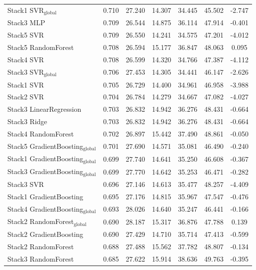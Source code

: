 \documentclass[a4paper,twocolumn]{article}
\begin{document}
\begin{table}
{\begin{tabular}{p{4.5cm}cccccc}
        Stack1 SVR$_{\text{global}}$ & 0.710 & 27.240 & 14.307 & 34.445 & 45.502 & -2.747 \\
        Stack3 MLP & 0.709 & 26.544 & 14.875 & 36.114 & 47.914 & -0.401 \\
        Stack5 SVR & 0.709 & 26.550 & 14.241 & 34.575 & 47.201 & -4.012 \\
        Stack5 RandomForest & 0.708 & 26.594 & 15.177 & 36.847 & 48.063 & 0.095 \\
        Stack4 SVR & 0.708 & 26.599 & 14.320 & 34.766 & 47.387 & -4.112 \\
        Stack3 SVR$_{\text{global}}$ & 0.706 & 27.453 & 14.305 & 34.441 & 46.147 & -2.626 \\
        Stack1 SVR & 0.705 & 26.729 & 14.400 & 34.961 & 46.958 & -3.988 \\
        Stack2 SVR & 0.704 & 26.784 & 14.279 & 34.667 & 47.082 & -4.027 \\
        Stack3 LinearRegression & 0.703 & 26.832 & 14.942 & 36.276 & 48.431 & -0.664 \\
        Stack3 Ridge & 0.703 & 26.832 & 14.942 & 36.276 & 48.431 & -0.664 \\
        Stack4 RandomForest & 0.702 & 26.897 & 15.442 & 37.490 & 48.861 & -0.050 \\
        Stack5 GradientBoosting$_{\text{global}}$ & 0.701 & 27.690 & 14.571 & 35.081 & 46.490 & -0.240 \\
        Stack1 GradientBoosting$_{\text{global}}$ & 0.699 & 27.740 & 14.641 & 35.250 & 46.608 & -0.367 \\
        Stack3 GradientBoosting$_{\text{global}}$ & 0.699 & 27.770 & 14.642 & 35.253 & 46.471 & -0.282 \\
        Stack3 SVR & 0.696 & 27.146 & 14.613 & 35.477 & 48.257 & -4.409 \\
        Stack1 GradientBoosting & 0.695 & 27.176 & 14.815 & 35.967 & 47.547 & -0.476 \\
        Stack4 GradientBoosting$_{\text{global}}$ & 0.693 & 28.026 & 14.640 & 35.247 & 46.441 & -0.166 \\
        Stack2 RandomForest$_{\text{global}}$ & 0.690 & 28.187 & 15.317 & 36.876 & 47.788 & 0.139 \\
        Stack2 GradientBoosting & 0.690 & 27.429 & 14.710 & 35.714 & 47.413 & -0.599 \\
        Stack2 RandomForest & 0.688 & 27.488 & 15.562 & 37.782 & 48.807 & -0.134 \\
        Stack3 RandomForest & 0.685 & 27.622 & 15.914 & 38.636 & 49.763 & -0.395 \\

\end{tabular}}
\end{table}
\end{document}
